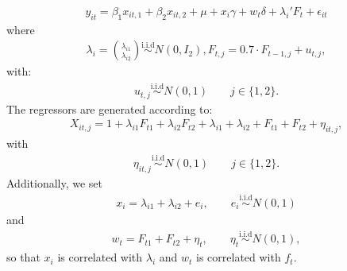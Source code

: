 \documentclass[a4paper,11pt,english]{sphinxmanual}
\begin{document}
\begin{fulllineitems}
\begin{description}
\end{description}
\begin{equation*}
\begin{split}y_{it} = \beta_{1}x_{it,1}+\beta_{2}x_{it,2}+ \mu+ x_{i}\gamma +w_{t}\delta +
\lambda_{i}'F_{t}+\epsilon_{it}\end{split}
\end{equation*}
\sphinxAtStartPar
where
\begin{equation*}
\begin{split}\lambda_i = \binom{\lambda_{i1}}{\lambda_{i2}} \stackrel{\text{i.i.d}}{\sim}
N(0,I_2),
F_{t,j}=0.7 \cdot F_{t-1,j}+ u_{t,j},\end{split}
\end{equation*}
\sphinxAtStartPar
with:
\begin{equation*}
\begin{split}u_{t,j}\stackrel{\text{i.i.d}}{\sim} N(0,1) \qquad j\in \{1,2\}.\end{split}
\end{equation*}
\sphinxAtStartPar
The regressors are generated according to:
\begin{equation*}
\begin{split}X_{it,j}= 1+\lambda_{i1}F_{t1}+\lambda_{i2}F_{t2}+\lambda_{i1}+\lambda_{i2}+
F_{t1}+F_{t2}+\eta_{it,j},\end{split}
\end{equation*}
\sphinxAtStartPar
with
\begin{equation*}
\begin{split}\eta_{it,j}\stackrel{\text{i.i.d}}{\sim} N(0,1) \qquad j\in \{1,2\}.\end{split}
\end{equation*}
\sphinxAtStartPar
Additionally,  we set
\begin{equation*}
\begin{split}x_{i}=\lambda_{i1}+\lambda_{i2}+e_{i},
\qquad e_{i} \stackrel{\text{i.i.d}}{\sim} N(0,1)\end{split}
\end{equation*}
\sphinxAtStartPar
and
\begin{equation*}
\begin{split}w_{t}=F_{t1}+F_{t2}+\eta_{t},
\qquad \eta_{t} \stackrel{\text{i.i.d}}{\sim} N(0,1),\end{split}
\end{equation*}
\sphinxAtStartPar
so that \(x_{i}\) is correlated with \(\lambda_i\) and \(w_t\) is
correlated with \(f_t\).

\end{fulllineitems}
\end{document}
